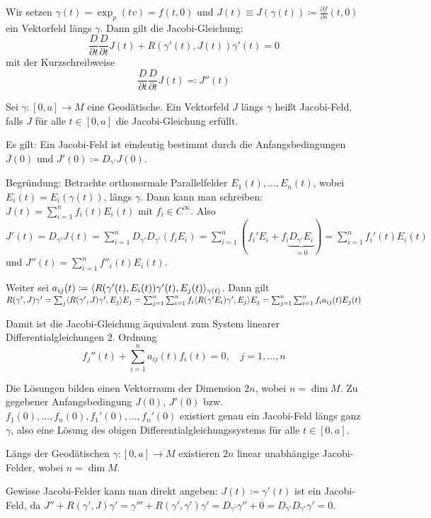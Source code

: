 \documentclass[a4paper,twoside,DIV15,BCOR12mm]{scrbook}
\renewcommand{\da}{\coloneqq}
\newcommand{\ad}{\eqqcolon}
\begin{document}
Wir setzen $\gamma(t) = \exp_p(tv) = f(t,0)$ und $J(t)\equiv J(\gamma(t)) \da \frac{\partial f}{\partial s} (t,0)$ ein Vektorfeld längs $\gamma$. Dann gilt die Jacobi-Gleichung:
\[
\frac D{\partial t} \frac D{\partial t} J(t) + R(\gamma'(t), J(t))\gamma'(t) = 0
\]
mit der Kurzschreibweise
\[
\frac D{\partial t} \frac D{\partial t} J(t) \ad J''(t)
\]

\begin{definition}
Sei  $\gamma: [0,a] \to M$ eine Geodätische. Ein Vektorfeld $J$ längs $\gamma$ heißt Jacobi-Feld, falls $J$ für alle $t\in[0,a]$ die Jacobi-Gleichung erfüllt.
\end{definition}

Es gilt: Ein Jacobi-Feld ist eindeutig bestimmt durch die Anfangsbedingungen $J(0)$ und $J'(0)\da D_{\gamma'} J(0)$.


Begründung: Betrachte orthonormale Parallelfelder $E_1(t),\ldots,E_n(t)$, wobei $E_i(t) = E_i(\gamma(t))$, längs $\gamma$. Dann kann man schreiben: $J(t) = \sum_{i=1}^n f_i(t) E_i(t)$ mit $f_i\in C^\infty$. Also $J'(t) = D_{\gamma'}J(t) = \sum_{i=1}^n D_{\gamma'} D_{\gamma'} (f_i E_i)= \sum_{i=1}^n (f_i' E_i+ f_i \underbrace{D_{\gamma'}E_i}_{=0}) 
= \sum_{i=1}^n f_i'(t) E_i(t)$ und $J''(t) = \sum_{i=1}^n f''_i(t) E_i(t)$.

Weiter sei $a_{ij}(t) \da \ksp {R(\gamma'(t), E_i(t))\gamma'(t)} {E_j(t)}_{\gamma(t)}$. Dann gilt $R(\gamma',J)\gamma' = \sum_j \langle R(\gamma',J)\gamma',E_j\rangle E_j
= \sum_{j=1}^n \sum_{i=1}^n f_i \langle R(\gamma' E_i)\gamma',E_j\rangle E_j
= \sum_{j=1}^n \sum_{i=1}^n f_i a_{ij}(t) E_j(t)$

Damit ist die Jacobi-Gleichung äquivalent zum System linearer Differentialgleichungen
2. Ordnung
\[
f_j''(t) + \sum_{i=1}^n a_{ij}(t) f_i(t) = 0,\quad j=1,\ldots,n
\]

Die Lösungen bilden einen Vektorraum der Dimension $2n$, wobei $n=\dim M$. Zu gegebener Anfangsbedingung $J(0)$, $J'(0)$ bzw. $f_1(0),\ldots,f_n(0),f_1'(0),\ldots,f_n'(0)$ existiert genau ein Jacobi-Feld längs ganz $\gamma$, also eine Lösung des obigen Differentialgleichungssystems für alle $t\in[0,a]$.

\begin{folgerung*}
Längs der Geodätischen $\gamma:[0,a] \to M$ existieren $2n$ linear unabhängige Jacobi-Felder, wobei $n=\dim M$.
\end{folgerung*}

\begin{bemerkung}
Gewisse Jacobi-Felder kann man direkt angeben:  $J(t) \da \gamma'(t)$ ist ein Jacobi-Feld, da $J'' + R(\gamma',J)\gamma' = \gamma''' + R(\gamma',\gamma')\gamma' = D_{\gamma'}\gamma'' + 0 = D_{\gamma'}D_{\gamma'} \gamma' = 0$.
\end{bemerkung}
\end{document}

